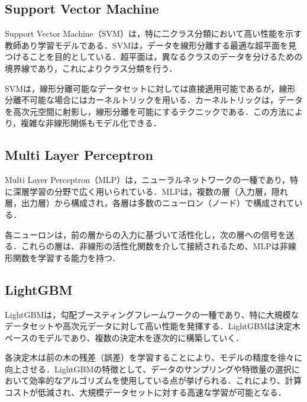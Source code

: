 \subsection{Support Vector Machine}

Support Vector Machine（SVM）は，特に二クラス分類において高い性能を示す教師あり学習モデルである．SVMは，データを線形分離する最適な超平面を見つけることを目的としている．超平面は，異なるクラスのデータを分けるための境界線であり，これによりクラス分類を行う．

SVMは，線形分離可能なデータセットに対しては直接適用可能であるが，線形分離不可能な場合にはカーネルトリックを用いる．カーネルトリックは，データを高次元空間に射影し，線形分離を可能にするテクニックである．この方法により，複雑な非線形関係もモデル化できる．

\subsection{Multi Layer Perceptron}

Multi Layer Perceptron（MLP）は，ニューラルネットワークの一種であり，特に深層学習の分野で広く用いられている．MLPは，複数の層（入力層，隠れ層，出力層）から構成され，各層は多数のニューロン（ノード）で構成されている．

各ニューロンは，前の層からの入力に基づいて活性化し，次の層への信号を送る．これらの層は、非線形の活性化関数を介して接続されるため、MLPは非線形関数を学習する能力を持つ．

\subsection{LightGBM}

LightGBMは，勾配ブースティングフレームワークの一種であり、特に大規模なデータセットや高次元データに対して高い性能を発揮する．LightGBMは決定木ベースのモデルであり、複数の決定木を逐次的に構築していく．

各決定木は前の木の残差（誤差）を学習することにより、モデルの精度を徐々に向上させる．LightGBMの特徴として、データのサンプリングや特徴量の選択において効率的なアルゴリズムを使用している点が挙げられる．これにより、計算コストが低減され、大規模データセットに対する高速な学習が可能となる．
